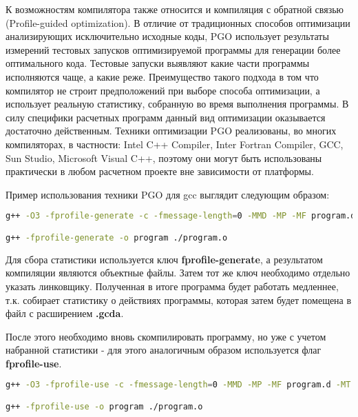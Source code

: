 К возможностям компилятора также относится и компиляция с обратной связью (Profile-guided optimization). В отличие от традиционных способов оптимизации анализирующих исключительно исходные коды, PGO использует результаты измерений тестовых запусков оптимизируемой программы для генерации более оптимального кода. Тестовые запуски выявляют какие части программы исполняются чаще, а какие реже. Преимущество такого подхода в том что компилятор не строит предположений при выборе способа оптимизации, а использует реальную статистику, собранную во время выполнения программы. В силу специфики расчетных программ данный вид оптимизации оказывается достаточно действенным. Техники оптимизации PGO реализованы, во многих компиляторах, в частности: Intel C++ Compiler, Inter Fortran Compiler, GCC, Sun Studio, Microsoft Visual C++, поэтому они могут быть использованы практически в любом расчетном проекте вне зависимости от платформы.

Пример использования техники PGO для gcc выглядит следующим образом:

\begin{lstlisting}[language=bash,caption=Пример компиляции для сбора статистики,label={lst:profile_generate}]
g++ -O3 -fprofile-generate -c -fmessage-length=0 -MMD -MP -MF program.d -MT program.d -o program.o program.cpp

g++ -fprofile-generate -o program ./program.o
\end{lstlisting}

Для сбора статистики используется ключ {\bf fprofile-generate}, а результатом компиляции являются объектные файлы. Затем тот же ключ необходимо отдельно указать линковщику. Полученная в итоге программа будет работать медленнее, т.к. собирает статистику о действиях программы, которая затем будет помещена в файл с расширением {\bf *.gcda}.

После этого необходимо вновь скомпилировать программу, но уже с учетом набранной статистики - для этого аналогичным образом используется флаг {\bf fprofile-use}.

\begin{lstlisting}[language=bash,caption=Пример компиляции с учетом статистики,label={lst:profile_use}]
g++ -O3 -fprofile-use -c -fmessage-length=0 -MMD -MP -MF program.d -MT program.d -o program.o program.cpp

g++ -fprofile-use -o program ./program.o
\end{lstlisting}

\newpage
\addtocounter{subsection}{1}
\setcounter{equation}{0}
